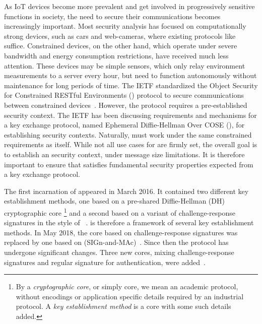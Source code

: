 \documentclass[a4paper,twoside]{article}
\begin{document}
As IoT devices become more prevalent and get involved in progressively sensitive
functions in society, the need to secure their communications
becomes increasingly important.
%
Most security analysis has focused on computationally
strong devices, such as cars and web-cameras, where existing protocols like
\mDandTls{} suffice.
%
Constrained devices, on the other hand, which operate under severe
bandwidth and energy consumption restrictions, have received much less
attention.
%
These devices may be simple sensors, which only relay environment
measurements to a server every hour, but need to function autonomously without
maintenance for long periods of time.
%
The IETF standardized the Object Security for
Constrained RESTful Environments (\mOscore{}) protocol to secure communications
between constrained devices~\cite{rfc8613}.
%
However, the \mOscore{} protocol requires a pre-established security context.
%
The IETF has been discussing requirements and mechanisms for a key
exchange protocol, named Ephemeral Diffie-Hellman Over COSE (\mEdhoc), for
establishing \mOscore{} security contexts.
%
Naturally, \mEdhoc{} must work under the same constrained requirements as
\mOscore{} itself.
%
While not all use cases for \mEdhoc{} are firmly set, the overall goal is to
establish an \mOscore{} security context, under message size limitations.
%
It is therefore important to ensure that \mEdhoc{} satisfies fundamental
security properties expected from a key exchange protocol.
%

The first incarnation of \mEdhoc{} appeared in March 2016.
%
It contained two different key establishment methods, one based on a
pre-shared Diffie-Hellman (DH) cryptographic core%
\footnote{By a \emph{cryptographic core}, or simply core, we mean an academic protocol,
without encodings or application specific details required by an industrial
protocol.
%
A \emph{key establishment method} is a core with some such details added.
}
and a second based on a
variant of challenge-response signatures in the style of 
\mOptls{}~\cite{DBLP:conf/eurosp/KrawczykW16}.
%
\mEdhoc{} is therefore a framework of several key establishment methods.
%
In May 2018, the core based on challenge-response signatures was replaced by
one based on \mSigma{} (SIGn-and-MAc)~\cite{sigma,bruni-analysis-selander-ace-cose-ecdhe-08}.
%
Since then the protocol has undergone significant changes.
%
Three new cores, mixing challenge-response signatures and regular signature for
authentication, were added~\cite{our-analysis-selander-lake-edhoc-00}.
%
\end{document}
